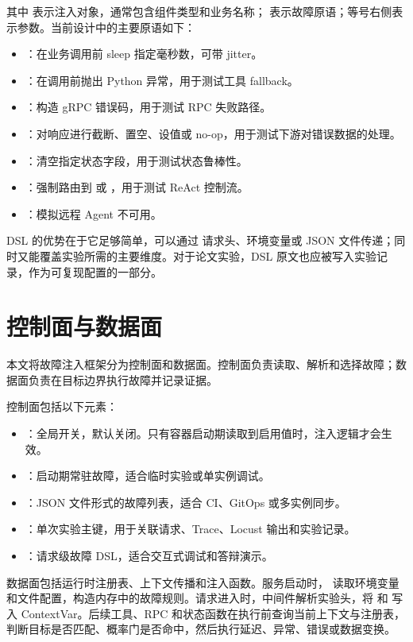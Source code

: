 其中  表示注入对象，通常包含组件类型和业务名称； 表示故障原语；等号右侧表示参数。当前设计中的主要原语如下：

\begin{itemize}
  \item {}：在业务调用前 sleep 指定毫秒数，可带 jitter。
  \item {}：在调用前抛出 Python 异常，用于测试工具 fallback。
  \item {}：构造 gRPC 错误码，用于测试 RPC 失败路径。
  \item {}：对响应进行截断、置空、设值或 no-op，用于测试下游对错误数据的处理。
  \item {}：清空指定状态字段，用于测试状态鲁棒性。
  \item {}：强制路由到  或 ，用于测试 ReAct 控制流。
  \item {}：模拟远程 Agent 不可用。
\end{itemize}

DSL 的优势在于它足够简单，可以通过  请求头、环境变量或 JSON 文件传递；同时又能覆盖实验所需的主要维度。对于论文实验，DSL 原文也应被写入实验记录，作为可复现配置的一部分。

\section{控制面与数据面}

本文将故障注入框架分为控制面和数据面。控制面负责读取、解析和选择故障；数据面负责在目标边界执行故障并记录证据。

控制面包括以下元素：

\begin{itemize}
  \item {}：全局开关，默认关闭。只有容器启动期读取到启用值时，注入逻辑才会生效。
  \item {}：启动期常驻故障，适合临时实验或单实例调试。
  \item {}：JSON 文件形式的故障列表，适合 CI、GitOps 或多实例同步。
  \item {}：单次实验主键，用于关联请求、Trace、Locust 输出和实验记录。
  \item {}：请求级故障 DSL，适合交互式调试和答辩演示。
\end{itemize}

数据面包括运行时注册表、上下文传播和注入函数。服务启动时， 读取环境变量和文件配置，构造内存中的故障规则。请求进入时，中间件解析实验头，将  和  写入 ContextVar。后续工具、RPC 和状态函数在执行前查询当前上下文与注册表，判断目标是否匹配、概率门是否命中，然后执行延迟、异常、错误或数据变换。

